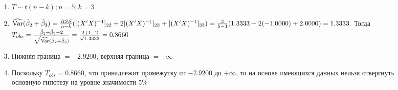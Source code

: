 \begin{solution}
\begin{enumerate}
\begin{enumerate}
\item $T \sim t(n-k); n = 5; k = 3$
\item $\widehat{\operatorname{Var}}(\hat{\beta}_2 + \hat{\beta}_3) = \frac{RSS}{n - k}([(X'X)^{-1}]_{22} + 2[(X'X)^{-1}]_{23} + [(X'X)^{-1}]_{33}) = \frac{2}{5 - 3} (1.3333 + 2(-1.0000) + 2.0000) = 1.3333.$ Тогда $T_{obs} = \frac{\hat{\beta}_2 + \hat{\beta}_3 - 2}{\sqrt{\widehat{\operatorname{Var}}(\hat{\beta}_2 + \hat{\beta}_3)}} = \frac{2 + 1 - 2}{\sqrt{1.3333}} = 0.8660$
\item Нижняя граница $= - 2.9200$, верхняя граница $= + \infty$
\item Поскольку $T_{obs} = 0.8660$, что принадлежит промежутку от $-  2.9200$ до $+ \infty$, то на основе имеющихся данных нельзя отвергнуть основную гипотезу на уровне значимости $5\%$
\end{enumerate}
\end{enumerate}
\end{solution}





